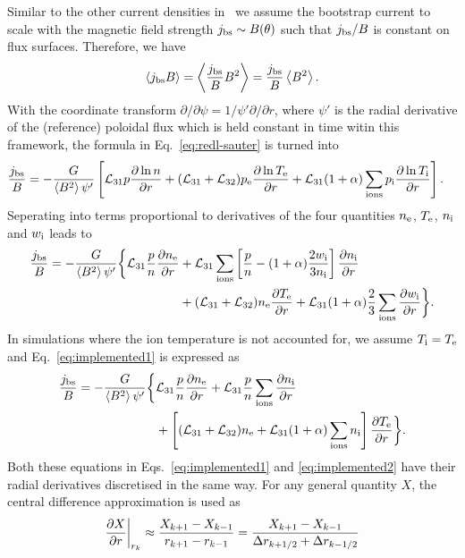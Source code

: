\documentclass{notes}
\newcommand{\pe}{p_{\rm e}}
\newcommand{\pii}{p_{\rm i}}
\newcommand{\te}{T_{\rm e}}
\renewcommand{\ne}{n_{\rm e}}
\newcommand{\tii}{T_{\rm i}}
\newcommand{\nii}{n_{\rm i}}
\newcommand{\wii}{w_{\rm i}}
\newcommand{\isum}{\sum_{\rm ions}}
\renewcommand{\L}[1]{\mathcal{L}_{#1}}
\newcommand{\jbs}{j_{\rm bs}}
\newcommand{\fsa}[1]{\left\langle #1 \right\rangle}
\begin{document}
    Similar to the other current densities in \DREAM\, we assume the bootstrap current to scale with the magnetic field strength $\jbs\sim B(\theta)$ such that $\jbs/B$ is constant on flux surfaces.
    Therefore, we have
    \begin{align}
        \fsa{\jbs B} = \fsa{\frac{\jbs}{B}B^2} = \frac{\jbs}{B}\fsa{B^2}.
    \end{align}
    With the coordinate transform $\partial/\partial{\psi}=1/\psi'\partial/\partial{r}$, where $\psi'$ is the radial derivative of the (reference) poloidal flux which is held constant in time witin this framework, the formula in Eq.~\eqref{eq:redl-sauter} is turned into
    \begin{align}
        \frac{\jbs}{B}
            &=-\frac{G}{\fsa{B^2}\psi'}\left[\L{31}p\pdv{\ln{n}}{r} + (\L{31}+\L{32})\pe\pdv{\ln{\te}}{r} + \L{31}(1+\alpha)\isum\pii\pdv{\ln{\tii}}{r}\right].
    \end{align}
    Seperating into terms proportional to derivatives of the four quantities $\ne$, $\te$, $\nii$ and $\wii$ leads to
    \begin{align}
        \label{eq:implemented1}
        \frac{\jbs}{B} = -\frac{G}{\fsa{B^2}\psi'}\bigg\{
            \L{31}\frac{p}{n}\pdv{\ne}{r}
            &+\L{31}\isum\left[\frac{p}{n}-(1+\alpha)\frac{2\wii}{3\nii}\right]\pdv{\nii}{r}\notag\\
            &+(\L{31}+\L{32})\ne\pdv{\te}{r}
            +\L{31}(1+\alpha)\frac{2}{3}\isum\pdv{\wii}{r}\bigg\}.
    \end{align}
    In simulations where the ion temperature is not accounted for, we assume $\tii=\te$ and Eq.~\eqref{eq:implemented1} is expressed as
    \begin{align}
        \label{eq:implemented2}
        \frac{\jbs}{B} = -\frac{G}{\fsa{B^2}\psi'}\bigg\{
            &\L{31}\frac{p}{n}\pdv{\ne}{r}
            +\L{31}\frac{p}{n}\isum\pdv{\nii}{r}\notag\\
            &+\left[(\L{31}+\L{32})\ne+\L{31}(1+\alpha)\isum\nii\right]\pdv{\te}{r}\bigg\}.
    \end{align}
    Both these equations in Eqs.~\eqref{eq:implemented1} and \eqref{eq:implemented2} have their radial derivatives discretised in the same way.
    For any general quantity $X$, the central difference approximation is used as
    \begin{align}
        \label{eq:central-difference}
        \pdv{X}{r}\bigg|_{r_{k}}
            \approx\frac{X_{k+1}-X_{k-1}}{r_{k+1}-r_{k-1}}
            =\frac{X_{k+1}-X_{k-1}}{\Delta r_{k+1/2}+\Delta r_{k-1/2}}
    \end{align}
\end{document}
